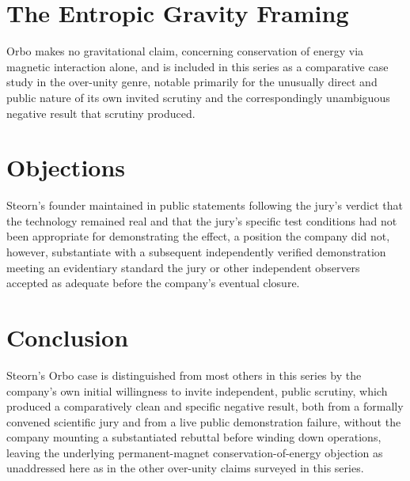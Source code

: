 \documentclass[11pt]{article}
\begin{document}
\section{The Entropic Gravity Framing}

Orbo makes no gravitational claim, concerning conservation of energy via magnetic interaction alone, and is included in this series as a comparative case study in the over-unity genre, notable primarily for the unusually direct and public nature of its own invited scrutiny and the correspondingly unambiguous negative result that scrutiny produced.

\section{Objections}

Steorn's founder maintained in public statements following the jury's verdict that the technology remained real and that the jury's specific test conditions had not been appropriate for demonstrating the effect, a position the company did not, however, substantiate with a subsequent independently verified demonstration meeting an evidentiary standard the jury or other independent observers accepted as adequate before the company's eventual closure.

\section{Conclusion}

Steorn's Orbo case is distinguished from most others in this series by the company's own initial willingness to invite independent, public scrutiny, which produced a comparatively clean and specific negative result, both from a formally convened scientific jury and from a live public demonstration failure, without the company mounting a substantiated rebuttal before winding down operations, leaving the underlying permanent-magnet conservation-of-energy objection as unaddressed here as in the other over-unity claims surveyed in this series.
\end{document}
